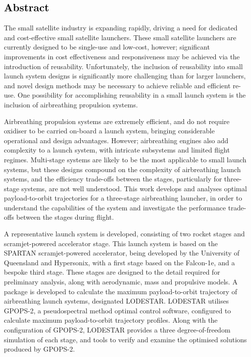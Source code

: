 \cleardoublepage
\textcolor{black}{
\section*{Abstract}
}
\noindent
 The small satellite industry is expanding rapidly, driving a need for dedicated and cost-effective small satellite launchers.  
These small satellite launchers are currently designed to be single-use and low-cost, however; significant improvements in cost effectiveness and responsiveness may be achieved via the introduction of reusability. Unfortunately, the inclusion of reusability into small launch system designs is significantly more challenging than for larger launchers, and novel design methods may be necessary to achieve reliable and efficient re-use. One possibility for accomplishing reusability in a small launch system is the inclusion of airbreathing propulsion systems.

Airbreathing propulsion systems are extremely efficient, and do not require oxidiser to be carried on-board a launch system, bringing considerable operational and design advantages. 
However; airbreathing engines also add complexity to a launch system, with intricate subsystems and limited flight regimes. 
Multi-stage systems are likely to be the most applicable to small launch systems, but these designs compound on the complexity of airbreathing launch systems, and the efficiency trade-offs between the stages, particularly for three-stage systems, are not well understood. This work develops and analyses optimal payload-to-orbit trajectories for a three-stage airbreathing launcher, in order to understand the capabilities of the system and investigate the performance trade-offs between the stages during flight.



 A representative launch system is developed, consisting of two rocket stages and scramjet-powered accelerator stage.
This launch system is based on the SPARTAN scramjet-powered accelerator, being developed by the University of Queensland and Hypersonix, with a first stage based on the Falcon-1e, and a bespoke third stage. These stages are designed to the detail required for preliminary analysis, along with aerodynamic, mass and propulsive models.
 A package is developed to calculate the maximum payload-to-orbit trajectory of airbreathing launch systems, designated LODESTAR. LODESTAR utilises GPOPS-2, a pseudospectral method optimal control software, configured to calculate maximum payload-to-orbit trajectory profiles. Along with the configuration of GPOPS-2, LODESTAR provides a three degree-of-freedom simulation of each stage, and tools to verify and examine the optimised solutions produced by GPOPS-2.


